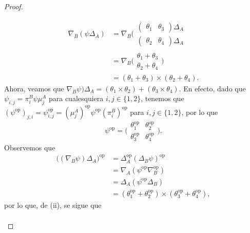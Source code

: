 \documentclass[tesis]{subfiles}
\begin{document}
\begin{proof}
\begin{itemize}
            \begin{align*}
                \nabla_B(\psi\Delta_A) &= \nabla_B\big(\begin{smallmatrix} (\begin{smallmatrix} \theta_1 &\theta_3 \end{smallmatrix})\Delta_A \\ (\begin{smallmatrix} \theta_2 &\theta_4 \end{smallmatrix})\Delta_A \end{smallmatrix} \\
                                       &= \nabla_B\big(\begin{smallmatrix} \theta_1+\theta_3 \\ \theta_2+\theta_4 \end{smallmatrix}\big) \\
                                       &= (\theta_1+\theta_3)\times(\theta_2+\theta_4).
            \end{align*}
            Ahora, veamos que $\nabla_B\psi)\Delta_A = (\theta_1\times\theta_2)+(\theta_3\times\theta_4)$. En efecto, dado que $\psi_{i,j}=\pi_i^B\psi\mu_j^A$ para cualesquiera $i,j\in\{1,2\}$, tenemos que $(\psi^{\text{op}})_{j,i}=\psi^{\text{op}}_{i,j}=(\mu_j^A)^{\text{op}}\psi^{\text{op}}(\pi_i^B)^{\text{op}}$ para $i,j\in\{1,2\}$, por lo que
            \[
                \psi^{\text{op}} = \big( \begin{smallmatrix} \theta_1^{\text{op}} &\theta_2^{\text{op}} \\ \theta_3^{\text{op}} &\theta_4^{\text{op}} \end{smallmatrix}\big).
            \] 
            Observemos que
            \begin{align*}
                \big((\nabla_B\psi)\Delta_A\big)^{\text{op}} &= \Delta_A^{\text{op}}(\Delta_B\psi)^{\text{op}} \\
                                                             &= \nabla_A(\psi^{\text{op}}\nabla_B^{\text{op}}) \\
                                                             &= \Delta_A(\psi^{\text{op}}\Delta_B) \\
                                                             &= (\theta_1^{\text{op}}+\theta_2^{\text{op}})\times(\theta_3^{\text{op}}+\theta_4^{\text{op}}),
            \end{align*}
            por lo que, de (ii), se sigue que
            \begin{align*}

\end{align*}
\end{itemize}
\end{proof}
\end{document}
